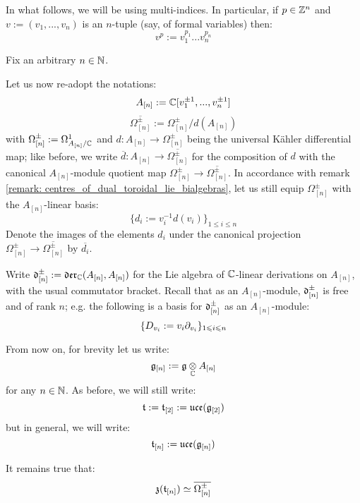             \begin{convention} 
                In what follows, we will be using multi-indices. In particular, if $p \in \mathbb{Z}^n$ and ${v} := (v_1, ..., v_n)$ is an $n$-tuple (say, of formal variables) then:
                    $${v}^{p} := v_1^{p_1} ... v_n^{p_n}$$
            \end{convention}
            \begin{convention}
                Fix an arbitrary $n \in \mathbb{N}$.
            
                Let us now re-adopt the notations:
                    $$A_{[n]} := \mathbb{C}[v_1^{\pm 1}, ..., v_n^{\pm 1}]$$
                    $$\overline{\Omega_{[n]}^{\pm}} := \Omega_{[n]}^{\pm}/d(A_{[n]})$$
                with $\Omega_{[n]}^{\pm} := \Omega^1_{A_{[n]}/\mathbb{C}}$ and $d: A_{[n]} \to \Omega_{[n]}^{\pm}$ being the universal K\"ahler differential map; like before, we write $\overline{d}: A_{[n]} \to \overline{\Omega_{[n]}^{\pm}}$ for the composition of $d$ with the canonical $A_{[n]}$-module quotient map $\Omega_{[n]}^{\pm} \to \overline{\Omega_{[n]}^{\pm}}$. In accordance with remark \ref{remark: centres_of_dual_toroidal_lie_bialgebras}, let us still equip $\Omega_{[n]}^{\pm}$ with the $A_{[n]}$-linear basis:
                    $$\{d_i := v_i^{-1} d(v_i)\}_{1 \leq i \leq n}$$
                Denote the images of the elements $d_i$ under the canonical projection $\Omega_{[n]}^{\pm} \to \overline{\Omega_{[n]}^{\pm}}$ by $\overline{d_i}$.
                    
                Write $\mathfrak{d}_{[n]}^{\pm} := \mathfrak{der}_{\mathbb{C}}(A_{[n]}, A_{[n]})$ for the Lie algebra of $\mathbb{C}$-linear derivations on $A_{[n]}$, with the usual commutator bracket. Recall that as an $A_{[n]}$-module, $\mathfrak{d}_{[n]}^{\pm}$ is free and of rank $n$; e.g. the following is a basis for $\mathfrak{d}_{[n]}^{\pm}$ as an $A_{[n]}$-module:
                    $$\{D_{v_i} := v_i \partial_{v_i}\}_{1 \leqslant i \leqslant n}$$
            \end{convention}
            
            \begin{convention}
                From now on, for brevity let us write:
                    $$\g_{[n]} := \g \tensor_{\bbC} A_{[n]}$$
                for any $n \in \mathbb{N}$. As before, we will still write:
                    $$\mathfrak{t} := \mathfrak{t}_{[2]} := \mathfrak{uce}(\mathfrak{g}_{[2]})$$
                but in general, we will write:
                    $$\mathfrak{t}_{[n]} := \mathfrak{uce}(\mathfrak{g}_{[n]})$$
            \end{convention}
            \begin{remark}
                It remains true that:
                    $$\mathfrak{z}(\mathfrak{t}_{[n]}) \simeq \overline{\Omega^{\pm}_{[n]}}$$
            \end{remark}

